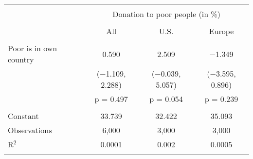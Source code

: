 
\begin{tabular}{@{\extracolsep{5pt}}lccc} 
\\[-1.8ex]\hline 
\hline \\[-1.8ex] 
 & \multicolumn{3}{c}{Donation to poor people (in \%)} \\ 
\cline{2-4} 
\\[-1.8ex] & All & U.S. & Europe \\ 
\hline \\[-1.8ex] 
 Poor is in own country & 0.590 & 2.509 & $-$1.349 \\ 
  & ($-$1.109, 2.288) & ($-$0.039, 5.057) & ($-$3.595, 0.896) \\ 
  & p = 0.497 & p = 0.054 & p = 0.239 \\ 
 \hline \\[-1.8ex] 
Constant & 33.739 & 32.422 & 35.093 \\ 
Observations & 6,000 & 3,000 & 3,000 \\ 
R$^{2}$ & 0.0001 & 0.002 & 0.0005 \\ 
\hline 
\hline \\[-1.8ex] 
\end{tabular} 